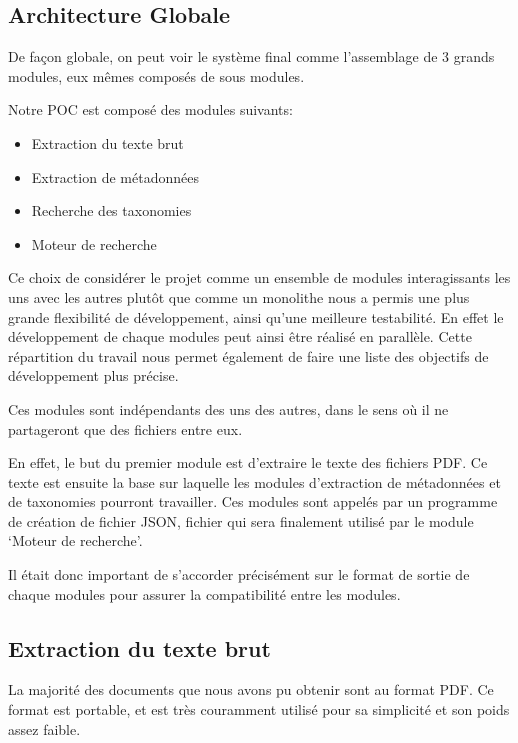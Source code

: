 

\subsection{Architecture Globale}
De façon globale, on peut voir le système final comme l'assemblage de 3 grands modules, eux mêmes composés de sous modules. 

Notre POC est composé des modules suivants:
\begin{itemize}
	\item Extraction du texte brut
	\item Extraction de métadonnées
	\item Recherche des taxonomies
	\item Moteur de recherche
\end{itemize}

Ce choix de considérer le projet comme un ensemble de modules interagissants les uns avec les autres plutôt que comme un monolithe nous a permis une plus grande flexibilité de développement, ainsi qu'une meilleure testabilité.
En effet le développement de chaque modules peut ainsi être réalisé en parallèle.
Cette répartition du travail nous permet également de faire une liste des objectifs de développement plus précise. 

Ces modules sont indépendants des uns des autres, dans le sens où il ne partageront que des fichiers entre eux.

En effet, le but du premier module est d'extraire le texte des fichiers PDF\@.
Ce texte est ensuite la base sur laquelle les modules d'extraction de métadonnées et de taxonomies pourront travailler.
Ces modules sont appelés par un programme de création de fichier \gls{JSON}, fichier qui sera finalement utilisé par le module `Moteur de recherche'. 

Il était donc important de s'accorder précisément sur le format de sortie de chaque modules pour assurer la compatibilité entre les modules.

\subsection{Extraction du texte brut}
La majorité des documents que nous avons pu obtenir sont au format PDF\@.
Ce format est portable, et est très couramment utilisé pour sa simplicité et son poids assez faible.

